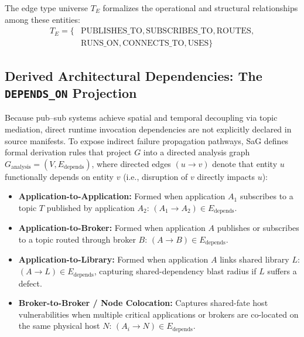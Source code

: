 The edge type universe $T_E$ formalizes the operational and structural relationships among these entities:
\begin{equation}
\begin{split}
T_E = \{ & \text{PUBLISHES\_TO}, \text{SUBSCRIBES\_TO}, \text{ROUTES}, \\
        & \text{RUNS\_ON}, \text{CONNECTS\_TO}, \text{USES}\}
\end{split}
\end{equation}

\subsection{Derived Architectural Dependencies: The \texttt{DEPENDS\_ON} Projection}
\label{sec:model:projection}

Because pub--sub systems achieve spatial and temporal decoupling via topic mediation, direct runtime invocation dependencies are not explicitly declared in source manifests. To expose indirect failure propagation pathways, SaG defines formal derivation rules that project $G$ into a directed analysis graph $G_{\text{analysis}} = (V, E_{\text{depends}})$, where directed edges $(u \to v)$ denote that entity $u$ functionally depends on entity $v$ (i.e., disruption of $v$ directly impacts $u$):

\begin{itemize}
    \item \textbf{Application-to-Application:} Formed when application $A_1$ subscribes to a topic $T$ published by application $A_2$: $(A_1 \to A_2) \in E_{\text{depends}}$.
    \item \textbf{Application-to-Broker:} Formed when application $A$ publishes or subscribes to a topic routed through broker $B$: $(A \to B) \in E_{\text{depends}}$.
    \item \textbf{Application-to-Library:} Formed when application $A$ links shared library $L$: $(A \to L) \in E_{\text{depends}}$, capturing shared-dependency blast radius if $L$ suffers a defect.
    \item \textbf{Broker-to-Broker / Node Colocation:} Captures shared-fate host vulnerabilities when multiple critical applications or brokers are co-located on the same physical host $N$: $(A_i \to N) \in E_{\text{depends}}$.
\end{itemize}

